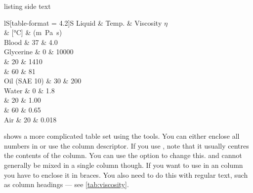 \begin{table}[htbp]
  \label{tab:viscosity}
  \centering
  \begin{tcblisting}{listing side text}
  \begin{tabular}{lS[table-format = 4.2]S}
    \toprule
    Liquid & {Temp.} & {Viscosity \(\eta\)}\\
    &  {[\si{\celsius}]} & {(\si{\metre\pascal\second})} \\
    \midrule
    Blood     & 37 & 4.0 \\
    Glycerine &  0 & 10000 \\
    & 20 & 1410 \\
    & 60 & 81 \\
    Oil (SAE 10) & 30 & 200 \\
    Water   &  0 & 1.8 \\
    & 20 & 1.00 \\
    & 60 & 0.65 \\
    Air     & 20 & 0.018 \\
    \bottomrule
  \end{tabular}
  \end{tcblisting}
\end{table}

 shows a more complicated table set using the
tools. You can either enclose all numbers in  or use the
 column descriptor. If you use , note that it
usually centres the contents of the column. You can use the
 option to change this.
 and  cannot generally be mixed in a single column though.
If you want to use  in an
 column you have to enclose it in braces. You also need to
do this with regular text, such as column headings --- see
\cref{tab:viscosity}.

